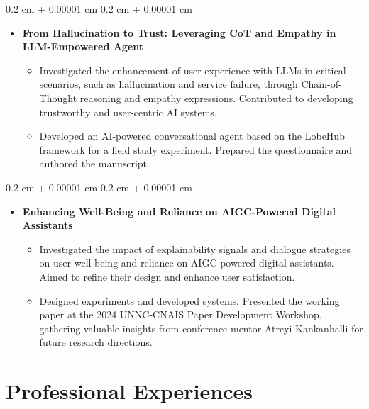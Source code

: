 \documentclass[10pt, letterpaper]{article}
\newenvironment{highlights}{
    \begin{itemize}[
        topsep=0.10 cm,
        parsep=0.10 cm,
        partopsep=0pt,
        itemsep=0pt,
        leftmargin=0.4 cm + 10pt
    ]
}{
    \end{itemize}
} %
\newenvironment{onecolentry}{
    \begin{adjustwidth}{
        0.2 cm + 0.00001 cm
    }{
        0.2 cm + 0.00001 cm
    }
}{
    \end{adjustwidth}
} %
\begin{document}
        \vspace{0.10 cm}
        \begin{onecolentry}
            \begin{highlights}
                \item \textbf{From Hallucination to Trust: Leveraging CoT and Empathy in LLM-Empowered Agent}
                \begin{itemize}
                    \item Investigated the enhancement of user experience with LLMs in critical scenarios, such as hallucination and service failure, through Chain-of-Thought reasoning and empathy expressions. Contributed to developing trustworthy and user-centric AI systems.
                    \item Developed an AI-powered conversational agent based on the LobeHub framework for a field study experiment. Prepared the questionnaire and authored the manuscript.
                \end{itemize}
            \end{highlights}
        \end{onecolentry}

        \vspace{0.10 cm}
        \begin{onecolentry}
            \begin{highlights}
                \item \textbf{Enhancing Well-Being and Reliance on AIGC-Powered Digital Assistants}
                \begin{itemize}
                    \item Investigated the impact of explainability signals and dialogue strategies on user well-being and reliance on AIGC-powered digital assistants. Aimed to refine their design and enhance user satisfaction.
                    \item Designed experiments and developed systems. Presented the working paper at the 2024 UNNC-CNAIS Paper Development Workshop, gathering valuable insights from conference mentor Atreyi Kankanhalli for future research directions.
                \end{itemize}
            \end{highlights}
        \end{onecolentry}

    \section{Professional Experiences}
\end{document}
